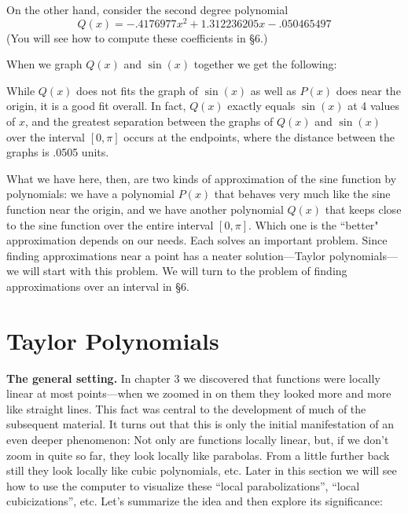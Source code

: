 {{{{\vspace*{2.4in}

On the other hand, consider the second degree polynomial 
\[
Q(x) = -.4176977 x^2 +1.312236205 x - .050465497
\]
(You will see how to compute these coefficients in \S6.)

When we graph $Q(x)$ and $\sin(x)$ together we get the following:

\vspace*{2in}

While $Q(x)$ does not fits the graph of $\sin(x)$ as well as $P(x)$ does near the origin, it is a good fit overall.  In fact, $Q(x)$ exactly equals $\sin(x)$ at 4 values of $x$, and the greatest separation between the graphs of $Q(x)$ and $\sin(x)$ over the interval $[0,\pi]$ occurs at the endpoints, where the distance between the graphs is .0505 units.

What we have here, then, are two kinds of approximation of the sine function by polynomials:  we have a polynomial $P(x)$ that behaves very much like the sine function near the origin, and we have another 
polynomial $Q(x)$ that keeps close to the sine function over the entire interval $[0, \pi]$. Which one is the ``better" approximation depends on our needs.  Each solves an important problem.  Since finding approximations near a point has a neater solution---Taylor polynomials---we will start with this problem.  We will turn to the problem of finding approximations over an interval in \S6.


\section{Taylor Polynomials}


{\bf The general setting.} In chapter 3 we discovered that functions were locally linear at most points---when we zoomed in on them they looked more and more like straight lines.  This fact was central to the development of much of the subsequent material.  It turns out that this is only the initial manifestation of an even deeper phenomenon:  Not only are functions locally linear, but, if we don't zoom in quite so far, they look locally like parabolas.  From a little further back still they look locally like cubic polynomials, etc.  Later in this section we will see how to use the computer to visualize these ``local parabolizations'',  ``local cubicizations'', etc.  Let's summarize the idea and then explore its significance:

}}}}
